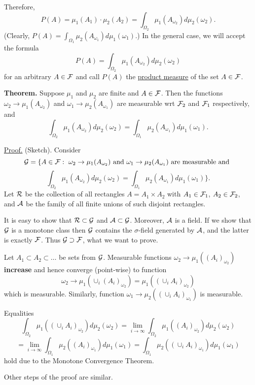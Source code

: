\documentclass[a4paper,10pt]{article}
\newcommand{\1}[1]{\mathbf{1}_{\{#1\}}}
\begin{document}
Therefore,
  $$P(A)=\mu_1(A_1)\cdot \mu_2(A_2)=\int_{\Omega_2}\mu_1(A_{\omega_2}) d\mu_2(\omega_2).$$
(Clearly, $\displaystyle P(A)=\int_{\Omega_1}\mu_2(A_{\omega_1}) d\mu_1(\omega_1)$.) In the general case, we will accept the formula
  $$P(A)=\int_{\Omega_2} \mu_1(A_{\omega_2}) d\mu_2(\omega_2)$$
for an arbitrary $A\in{\cal F}$ and call $P(A)$ the \underline{product measure} of the set $A\in{\cal F}$. \vspace{3mm}

{\bf Theorem.} Suppose $\mu_1$ and $\mu_2$ are finite and $A\in{\cal F}$. Then the functions $\omega_2\to\mu_1(A_{\omega_2})$ and $\omega_1\to\mu_2(A_{\omega_1})$ are measurable wrt ${\cal F}_2$ and ${\cal F}_1$ respectively, and
  $$\int_{\Omega_2}\mu_1(A_{\omega_2})d\mu_2(\omega_2)=\int_{\Omega_1}\mu_2(A_{\omega_1})d\mu_1(\omega_1).$$ \vspace{3mm}

\underline{Proof.} (Sketch). Consider
  $${\cal G}=\{A\in{\cal F}:~\omega_2\to \mu_1(A_{\omega_2}) \mbox{ and } \omega_1\to \mu_2(A_{\omega_1}) \mbox{ are measurable and }$$
  $$\int_{\Omega_2} \mu_1(A_{\omega_2})d\mu_2(\omega_2)=\int_{\Omega_1}\mu_2(A_{\omega_1})d\mu_1(\omega_1)\}.$$
Let ${\cal R}$ be the collection of all rectangles $A=A_1\times A_2$ with $A_1\in{\cal F}_1$, $A_2\in{\cal F}_2$, and ${\cal A}$ be the family of all finite unions of such disjoint rectangles.

It is easy to show that ${\cal R}\subset{\cal G}$ and ${\cal A}\subset{\cal G}$. Moreover, ${\cal A}$ is a field. If we show that ${\cal G}$ is a monotone class then $\cal G$ contains the $\sigma$-field generated by $\cal A$, and the latter is exactly $\cal F$. Thus ${\cal G}\supset {\cal F}$, what we want to prove.

Let $A_1\subset A_2\subset\ldots$ be sets from $\cal G$. Measurable functions $\omega_2\to\mu_1((A_i)_{\omega_2})$ {\bf increase} and hence converge (point-wise) to function
  $$\omega_2\to \mu_1(\cup_i(A_i)_{\omega_2})=\mu_1((\cup_i A_i)_{\omega_2})$$
which is measurable. Similarly, function $\omega_1\to\mu_2((\cup_i A_i)_{\omega_1})$ is measurable.

Equalities
  $$\int_{\Omega_2} \mu_1((\cup_i A_i)_{\omega_2})d\mu_2(\omega_2)=\lim_{i\to\infty}\int_{\Omega_2} \mu_1((A_i)_{\omega_2})d\mu_2(\omega_2)$$
  $$=\lim_{i\to\infty}\int_{\Omega_1} \mu_2((A_i)_{\omega_1})d\mu_1(\omega_1)=\int_{\Omega_1} \mu_2((\cup_i A_i)_{\omega_1})d\mu_1(\omega_1)$$
hold due to the Monotone Convergence Theorem.

Other steps of the proof are similar. \blacksquare\vspace{3mm}
\end{document}
